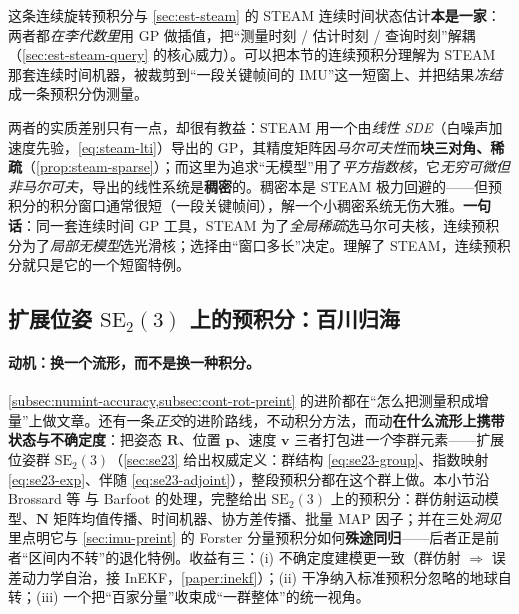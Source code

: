 \begin{insight}\label{ins:preint-steam}
这条连续旋转预积分与 \cref{sec:est-steam} 的 STEAM 连续时间状态估计\textbf{本是一家}：两者都\emph{在李代数里}用 GP 做插值，把“测量时刻 / 估计时刻 / 查询时刻”解耦（\cref{sec:est-steam-query} 的核心威力）。可以把本节的连续预积分理解为 STEAM 那套连续时间机器，被裁剪到“一段关键帧间的 IMU”这一短窗上、并把结果\emph{冻结}成一条预积分伪测量。

两者的实质差别只有一点，却很有教益：STEAM 用一个由\emph{线性 SDE}（白噪声加速度先验，\cref{eq:steam-lti}）导出的 GP，其精度矩阵因\emph{马尔可夫性}而\textbf{块三对角、稀疏}（\cref{prop:steam-sparse}）；而这里为追求“无模型”用了\emph{平方指数核}，它\emph{无穷可微但非马尔可夫}，导出的线性系统是\textbf{稠密}的。稠密本是 STEAM 极力回避的——但预积分的积分窗口通常很短（一段关键帧间），解一个小稠密系统无伤大雅。\textbf{一句话}：同一套连续时间 GP 工具，STEAM 为了\emph{全局稀疏}选马尔可夫核，连续预积分为了\emph{局部无模型}选光滑核；选择由“窗口多长”决定。理解了 STEAM，连续预积分就只是它的一个短窗特例。
\end{insight}

\subsection{扩展位姿 \texorpdfstring{$\mathrm{SE}_2(3)$}{SE2(3)} 上的预积分：百川归海}
\label{subsec:imu-se23-preint}

\paragraph{动机：换一个流形，而不是换一种积分。}
\cref{subsec:numint-accuracy,subsec:cont-rot-preint} 的进阶都在“怎么把测量积成增量”上做文章。还有一条\emph{正交}的进阶路线，不动积分方法，而动\textbf{在什么流形上携带状态与不确定度}：把姿态 $\mathbf R$、位置 $\mathbf p$、速度 $\mathbf v$ 三者打包进\emph{一个}李群元素——扩展位姿群 $\mathrm{SE}_2(3)$（\cref{sec:se23} 给出权威定义：群结构 \cref{eq:se23-group}、指数映射 \cref{eq:se23-exp}、伴随 \cref{eq:se23-adjoint}），整段预积分都在这个群上做。本小节沿 Brossard 等\cite{brossard2021associating} 与 Barfoot\cite{barfoot2024state} 的处理，完整给出 $\mathrm{SE}_2(3)$ 上的预积分：群仿射运动模型、$\mathbf N$ 矩阵均值传播、时间机器、协方差传播、批量 MAP 因子；并在三处\emph{洞见}里点明它与 \cref{sec:imu-preint} 的 Forster 分量预积分如何\textbf{殊途同归}——后者正是前者“区间内不转”的退化特例。收益有三：(i) 不确定度建模更一致（群仿射 $\Rightarrow$ 误差动力学自治，接 InEKF，\cref{paper:inekf}）；(ii) 干净纳入标准预积分忽略的地球自转；(iii) 一个把“百家分量”收束成“一群整体”的统一视角。

